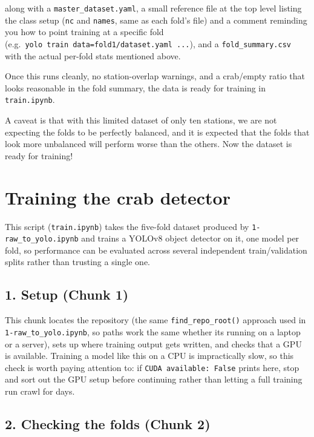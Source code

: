 \documentclass[
]{book}
\begin{document}
along with a \texttt{master\_dataset.yaml}, a small reference file at the top level listing the class setup (\texttt{nc} and \texttt{names}, same as each fold's file) and a comment reminding you how to point training at a specific fold (e.g.~\texttt{yolo\ train\ data=fold1/dataset.yaml\ ...}), and a \texttt{fold\_summary.csv} with the actual per-fold stats mentioned above.

Once this runs cleanly, no station-overlap warnings, and a crab/empty ratio that looks reasonable in the fold summary, the data is ready for training in \texttt{train.ipynb}.

A caveat is that with this limited dataset of only ten stations, we are not expecting the folds to be perfectly balanced, and it is expected that the folds that look more unbalanced will perform worse than the others. Now the dataset is ready for training!

\section{Training the crab detector}\label{training-the-crab-detector}

This script (\texttt{train.ipynb}) takes the five-fold dataset produced by \texttt{1-raw\_to\_yolo.ipynb} and trains a YOLOv8 object detector on it, one model per fold, so performance can be evaluated across several independent train/validation splits rather than trusting a single one.

\subsection*{1. Setup (Chunk 1)}\label{setup-chunk-1}

This chunk locates the repository (the same \texttt{find\_repo\_root()} approach used in \texttt{1-raw\_to\_yolo.ipynb}, so paths work the same whether its running on a laptop or a server), sets up where training output gets written, and checks that a GPU is available. Training a model like this on a CPU is impractically slow, so this check is worth paying attention to: if \texttt{CUDA\ available:\ False} prints here, stop and sort out the GPU setup before continuing rather than letting a full training run crawl for days.

\subsection*{2. Checking the folds (Chunk 2)}\label{checking-the-folds-chunk-2}
\end{document}
